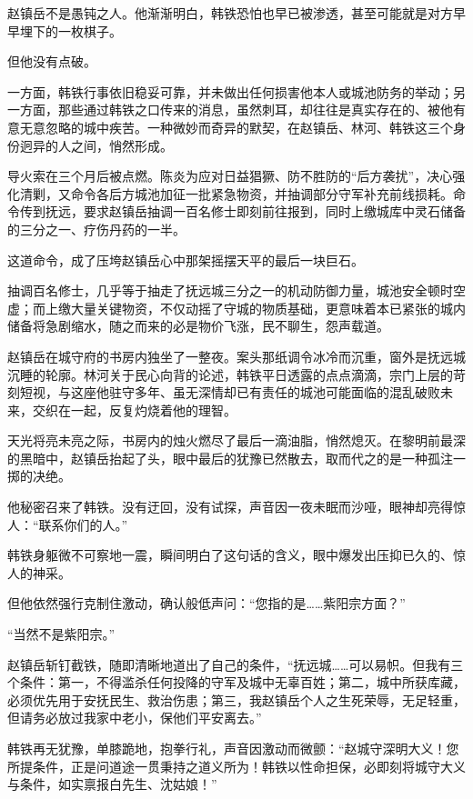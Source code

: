 赵镇岳不是愚钝之人。他渐渐明白，韩铁恐怕也早已被渗透，甚至可能就是对方早早埋下的一枚棋子。

但他没有点破。

一方面，韩铁行事依旧稳妥可靠，并未做出任何损害他本人或城池防务的举动；另一方面，那些通过韩铁之口传来的消息，虽然刺耳，却往往是真实存在的、被他有意无意忽略的城中疾苦。一种微妙而奇异的默契，在赵镇岳、林河、韩铁这三个身份迥异的人之间，悄然形成。

\vspace{2em}

导火索在三个月后被点燃。陈炎为应对日益猖獗、防不胜防的“后方袭扰”，决心强化清剿，又命令各后方城池加征一批紧急物资，并抽调部分守军补充前线损耗。命令传到抚远，要求赵镇岳抽调一百名修士即刻前往报到，同时上缴城库中灵石储备的三分之一、疗伤丹药的一半。

这道命令，成了压垮赵镇岳心中那架摇摆天平的最后一块巨石。

抽调百名修士，几乎等于抽走了抚远城三分之一的机动防御力量，城池安全顿时空虚；而上缴大量关键物资，不仅动摇了守城的物质基础，更意味着本已紧张的城内储备将急剧缩水，随之而来的必是物价飞涨，民不聊生，怨声载道。

赵镇岳在城守府的书房内独坐了一整夜。案头那纸调令冰冷而沉重，窗外是抚远城沉睡的轮廓。林河关于民心向背的论述，韩铁平日透露的点点滴滴，宗门上层的苛刻短视，与这座他驻守多年、虽无深情却已有责任的城池可能面临的混乱破败未来，交织在一起，反复灼烧着他的理智。

天光将亮未亮之际，书房内的烛火燃尽了最后一滴油脂，悄然熄灭。在黎明前最深的黑暗中，赵镇岳抬起了头，眼中最后的犹豫已然散去，取而代之的是一种孤注一掷的决绝。

他秘密召来了韩铁。没有迂回，没有试探，声音因一夜未眠而沙哑，眼神却亮得惊人：“联系你们的人。”

韩铁身躯微不可察地一震，瞬间明白了这句话的含义，眼中爆发出压抑已久的、惊人的神采。

但他依然强行克制住激动，确认般低声问：“您指的是……紫阳宗方面？”

“当然不是紫阳宗。”

赵镇岳斩钉截铁，随即清晰地道出了自己的条件，“抚远城……可以易帜。但我有三个条件：第一，不得滥杀任何投降的守军及城中无辜百姓；第二，城中所获库藏，必须优先用于安抚民生、救治伤患；第三，我赵镇岳个人之生死荣辱，无足轻重，但请务必放过我家中老小，保他们平安离去。”

韩铁再无犹豫，单膝跪地，抱拳行礼，声音因激动而微颤：“赵城守深明大义！您所提条件，正是问道途一贯秉持之道义所为！韩铁以性命担保，必即刻将城守大义与条件，如实禀报白先生、沈姑娘！”

